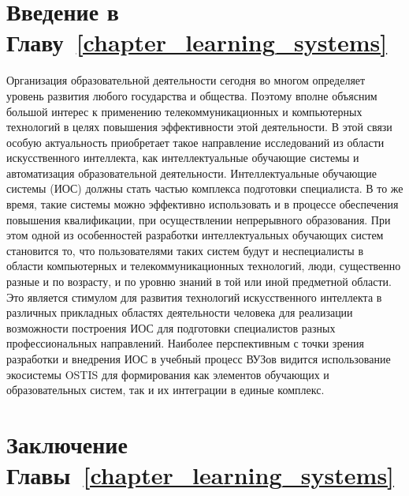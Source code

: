 \section*{Введение в Главу~\ref{chapter_learning_systems}}
Организация образовательной деятельности сегодня во многом определяет уровень развития любого государства и общества. Поэтому вполне объясним большой интерес к применению телекоммуникационных и компьютерных технологий в целях повышения эффективности этой деятельности. В этой связи особую актуальность приобретает такое направление исследований из области искусственного интеллекта, как интеллектуальные обучающие системы и автоматизация образовательной деятельности. Интеллектуальные обучающие системы (ИОС) должны стать частью комплекса подготовки специалиста. В то же время, такие системы можно эффективно использовать и в процессе обеспечения повышения квалификации, при осуществлении непрерывного образования. При этом одной из особенностей разработки интеллектуальных обучающих систем становится то, что пользователями таких систем будут и неспециалисты в области компьютерных и телекоммуникационных технологий, люди, существенно разные и по возрасту, и по уровню знаний в той или иной предметной области. Это является стимулом для развития технологий искусственного интеллекта в различных прикладных областях деятельности человека для реализации возможности построения ИОС для подготовки специалистов разных профессиональных направлений. Наиболее перспективным с точки зрения разработки и внедрения ИОС в учебный процесс ВУЗов видится использование экосистемы OSTIS для формирования как элементов обучающих и образовательных систем, так и их интеграции в единые комплекс.







\section*{Заключение Главы~\ref{chapter_learning_systems}}

%